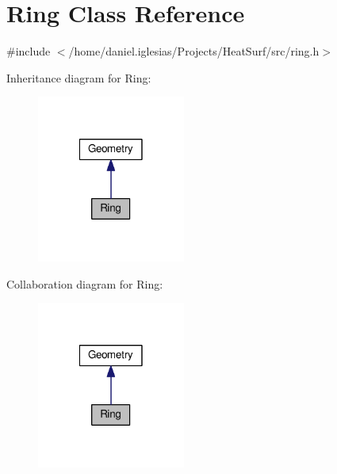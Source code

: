 \hypertarget{classRing}{\section{Ring Class Reference}
\label{classRing}
}


{\ttfamily \#include $<$/home/daniel.\-iglesias/\-Projects/\-Heat\-Surf/src/ring.\-h$>$}



Inheritance diagram for Ring\-:\nopagebreak
\begin{figure}[H]
\begin{center}
\leavevmode
\includegraphics[width=138pt]{classRing__inherit__graph}
\end{center}
\end{figure}


Collaboration diagram for Ring\-:\nopagebreak
\begin{figure}[H]
\begin{center}
\leavevmode
\includegraphics[width=138pt]{classRing__coll__graph}
\end{center}
\end{figure}
